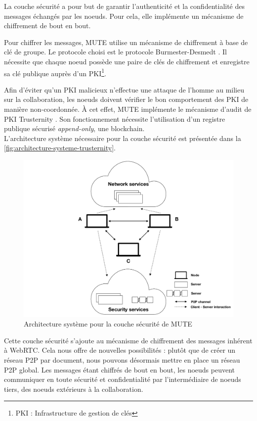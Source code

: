 \label{sec:mute-couche-securite}

La couche sécurité a pour but de garantir l'authenticité et la confidentialité des messages échangés par les noeuds.
Pour cela, elle implémente un mécanisme de chiffrement de bout en bout.

Pour chiffrer les messages, MUTE utilise un mécanisme de chiffrement à base de clé de groupe.
Le protocole choisi est le protocole Burmester-Desmedt \cite{1995-burmester-desmedt}.
Il nécessite que chaque noeud possède une paire de clés de chiffrement et enregistre sa clé publique auprès d'un PKI\footnote{\acf{PKI} : Infrastructure de gestion de clés}.

Afin d'éviter qu'un \ac{PKI} malicieux n'effectue une attaque de l'homme au milieu sur la collaboration, les noeuds doivent vérifier le bon comportement des PKI de manière non-coordonnée.
À cet effet, MUTE implémente le mécanisme d'audit de PKI Trusternity \cite{2018-trusternity-short, 2018-trusternity-long}.
Son fonctionnement nécessite l'utilisation d'un registre publique sécurisé \emph{append-only}, \ie une blockchain.\\

L'architecture système nécessaire pour la couche sécurité est présentée dans la \autoref{fig:architecture-systeme-trusternity}.

\begin{figure}[!ht]
  \centering
  \includegraphics[page=4, trim=3cm 1cm 4cm 1cm, clip, width=.7\linewidth]{img/mute-figures.pdf}
  \caption{Architecture système pour la couche sécurité de MUTE}
  \label{fig:architecture-systeme-trusternity}
\end{figure}

Cette couche sécurité s'ajoute au mécanisme de chiffrement des messages inhérent à \ac{WebRTC}.
Cela nous offre de nouvelles possibilités : plutôt que de créer un réseau \ac{P2P} par document, nous pouvons désormais mettre en place un réseau \ac{P2P} global.
Les messages étant chiffrés de bout en bout, les noeuds peuvent communiquer en toute sécurité et confidentialité par l'intermédiaire de noeuds tiers, \ie des noeuds extérieurs à la collaboration.\\

